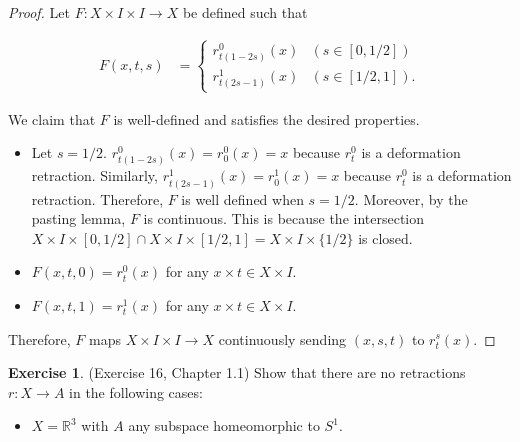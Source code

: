 \documentclass[12pt, psamsfonts]{amsart}
\theoremstyle{definition}
\newtheorem{exer}[thm]{Exercise}
\theoremstyle{remark}
\numberwithin{equation}{section}
\begin{document}
\begin{proof}
  Let $F: X \times I \times I \rightarrow X$ be defined such that

  \begin{align*}
    F(x, t, s) &= \begin{cases}
      r_{t(1 - 2s)}^0(x) & (s \in [0, 1/2]) \\
      r_{t(2s - 1)}^1(x) & (s \in [1/2, 1]).
    \end{cases}
  \end{align*}

  We claim that $F$ is well-defined and satisfies the desired properties.

  \begin{itemize}
    \item
      Let $s = 1 / 2$.
      $r_{t(1 - 2s)}^0(x) = r_0^0(x) = x$ because $r^0_t$ is a deformation retraction.
      Similarly, $r_{t(2s - 1)}^1(x) = r_0^1(x) = x$ because $r^0_t$ is a deformation retraction.
      Therefore, $F$ is well defined when $s = 1/2$.
      Moreover, by the pasting lemma, $F$ is continuous.
      This is because the intersection $X \times I \times [0, 1/2] \cap X \times I \times [1/2, 1] = X \times I \times \{ 1/2 \}$ is closed.
    \item
      $F(x, t, 0) = r_t^0(x)$ for any $x \times t \in X \times I$.
    \item
      $F(x, t, 1) = r_t^1(x)$ for any $x \times t \in X \times I$.
  \end{itemize}

  Therefore, $F$ maps $X \times I \times I \rightarrow X$ continuously sending $(x, s, t)$ to $r^s_t(x)$.
\end{proof}

\begin{exer}{(Exercise 16, Chapter 1.1)}
  Show that there are no retractions $r: X \rightarrow A$ in the following cases:
  \begin{itemize}
    \item
      $X = \mathbb{R}^3$ with $A$ any subspace homeomorphic to $S^1$.
  \end{itemize}
\end{exer}
\end{document}
